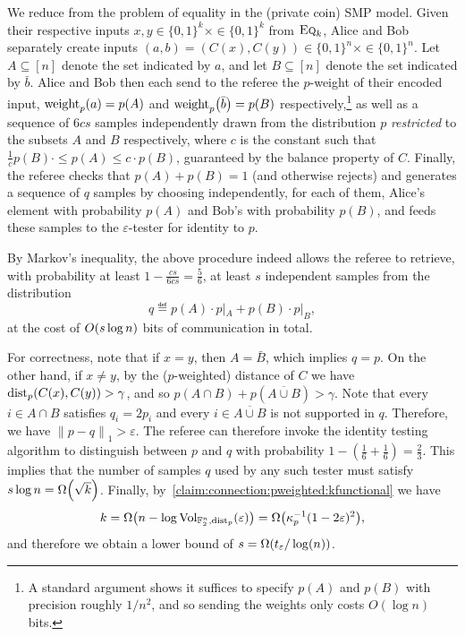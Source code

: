 \documentclass[11pt]{article}
\theoremstyle{remark}   	\newtheorem{remark}[theorem]{Remark}
\theoremstyle{definition}   	\newaliascnt{defn}{theorem}
\newcommand{\eps}{\ensuremath{\varepsilon}\xspace}
\newcommand{\bigO}[1]{{O\mleft( #1 \mright)}}
\newcommand{\bigOmega}[1]{{\Omega\mleft( #1 \mright)}}
\newcommand{\norm}[1]{\lVert#1{\rVert}}
\newcommand{\normone}[1]{{\norm{#1}}_1}
\newcommand{\kf}[1]{\kappa_{#1}}
\newcommand{\pdistfunc}[1][p]{\operatorname{dist}_{#1}}
\newcommand{\pweightfunc}[1][p]{\operatorname{weight}_{#1}}
\newcommand{\pdist}[3][p]{\pdistfunc[#1]\mleft({#2, #3}\mright)}
\newcommand{\pweight}[2][p]{\pweightfunc[#1]\mleft({#2}\mright)}
\newcommand{\EQ}[1][n]{\textsc{Eq}_{#1}}
\begin{document}
We reduce from the problem of equality in the (private coin) SMP model. Given their respective inputs $x,y\in\{0,1\}^k\times \in\{0,1\}^k$ from $\EQ[k]$, Alice and Bob separately create inputs $(a,b)=(C(x),C(y))\in\{0,1\}^n\times \in\{0,1\}^n$. Let $A\subseteq[n]$ denote the set indicated by $a$, and let $B\subseteq[n]$ denote the set indicated by $\bar{b}$. Alice and Bob then each send to the referee the $p$-weight of their encoded input, $\pweight[p]{a}=p(A)$ and $\pweight[p]{\bar{b}}=p(B)$ respectively,\footnote{A standard argument shows it suffices to specify $p(A)$ and $p(B)$ with precision roughly $1/n^2$, and so sending the weights only costs $O(\log n)$ bits.} as well as a sequence of $6cs$ samples independently drawn from the distribution $p$ \emph{restricted} to the subsets $A$ and $B$ respectively, where $c$ is the constant such that $\frac{1}{c}p(B) \cdot \leq p(A) \leq c \cdot p(B)$, guaranteed by the balance property of $C$. Finally, the referee checks that $p(A)+p(B)=1$ (and otherwise rejects) and generates a sequence of $q$ samples by choosing independently, for each of them, Alice's element with probability $p(A)$ and Bob's with probability $p(B)$, and feeds these samples to the $\eps$-tester for identity to $p$.

By Markov's inequality, the above procedure indeed allows the referee to retrieve, with probability at least $1-\frac{cs}{6cs}=\frac{5}{6}$, at least $s$ independent samples from the distribution 
\[
q \eqdef p(A) \cdot p|_A + p(B) \cdot p|_B,
\] 
at the cost of $\bigO{s\log n}$ bits of communication in total.

For correctness, note that if $x=y$, then $A=\bar{B}$, which implies $q=p$. On the other hand, if $x\neq y$, by the ($p$-weighted) distance of $C$ we have $\pdist[p]{C(x)}{C(y)} > \gamma$, and so $p(A \cap B) +p(\overline{A \cup B})  > \gamma$. Note that every $i \in A \cap B$ satisfies $q_i = 2p_i$ and every $i \in \overline{A \cup B}$ is not supported in $q$. Therefore, we have $\normone{p-q} > \eps$. The referee can therefore invoke the identity testing algorithm to distinguish between $p$ and $q$ with probability $1-(\frac{1}{6}+\frac{1}{6}) = \frac{2}{3}$. This implies that the number of samples $q$ used by any such tester must satisfy $s\log n =\bigOmega{\sqrt{k}}$. Finally, by~\autoref{claim:connection:pweighted:kfunctional} we have
\[
    k = \bigOmega{ n - \log \operatorname{Vol}_{\mathbb{F}_2^n,\pdistfunc[p]}(\eps) } = \bigOmega{ \kf{p}^{-1}(1-2\eps)^2 },
\]
and therefore we obtain a lower bound of $s = \bigOmega{t_\eps/\log(n)}$.
\end{document}

